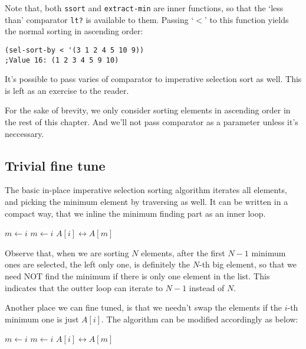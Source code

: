 \documentclass{article}
\begin{document}
Note that, both \verb|ssort| and \verb|extract-min| are inner functions, so that the
`less than' comparator \verb|lt?| is available to them. Passing `$<$' to this function
yields the normal sorting in ascending order:

\lstset{language=Lisp}
\begin{lstlisting}
(sel-sort-by < '(3 1 2 4 5 10 9))
;Value 16: (1 2 3 4 5 9 10)
\end{lstlisting}

It's possible to pass varies of comparator to imperative selection sort as well. This
is left as an exercise to the reader.

For the sake of brevity, we only consider sorting elements in ascending order in
the rest of this chapter. And we'll not pass comparator as a parameter unless it's
neccessary.

\subsection{Trivial fine tune}

The basic in-place imperative selection sorting algorithm iterates all elements, and picking the
minimum element by traversing as well. It can be written in a compact way, that we 
inline the minimum finding part as an inner loop.

\begin{algorithmic}
    \State $m \gets i$
        \State $m \gets i$
      \EndIf
    \EndFor
    \State {} $A[i] \leftrightarrow A[m]$
  \EndFor
\EndProcedure
\end{algorithmic}

Observe that, when we are sorting $N$ elements, after the first $N-1$ minimum ones are selected,
the left only one, is definitely the $N$-th big element, so that we need NOT find the 
minimum if there is only one element in the list. This indicates that the outter loop can
iterate to $N-1$ instead of $N$.

Another place we can fine tuned, is that we needn't swap the elements if the $i$-th minimum one
is just $A[i]$. The algorithm can be modified accordingly as below:

\begin{algorithmic}
    \State $m \gets i$
        \State $m \gets i$
      \EndIf
    \EndFor
      \State {} $A[i] \leftrightarrow A[m]$
    \EndIf
  \EndFor
\EndProcedure
\end{algorithmic}
\end{document}

